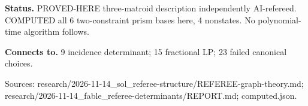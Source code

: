 \documentclass[10pt,a4paper]{amsart}
\begin{document}
\textbf{Status.} PROVED-HERE three-matroid description independently AI-refereed. COMPUTED all 6 two-constraint prism bases here, 4 nonstates. No polynomial-time algorithm follows.

\textbf{Connects to.} 9 incidence determinant; 15 fractional LP; 23 failed canonical choices.

{\footnotesize\raggedright Sources: research/\allowbreak{}2026-11-14\_sol\_referee-structure/\allowbreak{}REFEREE-graph-theory.md;\allowbreak{} research/\allowbreak{}2026-11-14\_fable\_referee-determinants/\allowbreak{}REPORT.md;\allowbreak{} computed.json.\par}
\end{document}
